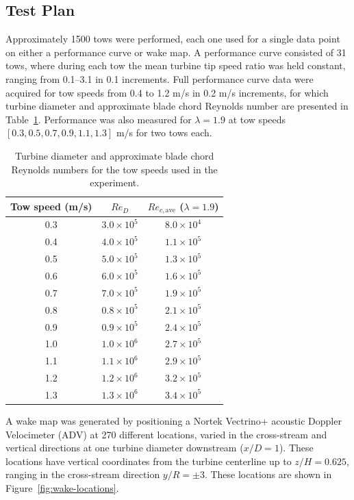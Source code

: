 \documentclass[energies,article,accept,moreauthors,pdftex,12pt,a4paper]{mdpi}
\begin{document}


\subsection{Test Plan} 

Approximately 1500 tows were performed, each one used for a single data point on
either a performance curve or wake map. A performance curve consisted of 31
tows, where during each tow the mean turbine tip speed ratio was held constant,
ranging from 0.1--3.1 in 0.1 increments. Full performance curve data were
acquired for tow speeds from 0.4 to 1.2 m/s in 0.2 m/s increments, for which
turbine diameter and approximate blade chord Reynolds number are presented in
Table~\ref{tab:Re}. Performance was also measured for $\lambda=1.9$ at tow
speeds $[0.3, 0.5, 0.7, 0.9, 1.1, 1.3]$ m/s for two tows each.

\begin{table}
\centering
\begin{tabular}{ccc}
Tow speed (m/s) & $Re_D$ & $Re_{c,\mathrm{ave}}$ ($\lambda = 1.9$) \\ 
\hline
0.3 & $3.0 \times 10^5$ & $8.0 \times 10^4$ \\ 
0.4 & $4.0 \times 10^5$ & $1.1 \times 10^5$ \\ 
0.5 & $5.0 \times 10^5$ & $1.3 \times 10^5$ \\ 
0.6 & $6.0 \times 10^5$ & $1.6 \times 10^5$ \\ 
0.7 & $7.0 \times 10^5$ & $1.9 \times 10^5$ \\ 
0.8 & $0.8 \times 10^5$ & $2.1 \times 10^5$ \\ 
0.9 & $0.9 \times 10^5$ & $2.4 \times 10^5$ \\ 
1.0 & $1.0 \times 10^6$ & $2.7 \times 10^5$ \\ 
1.1 & $1.1 \times 10^6$ & $2.9 \times 10^5$ \\ 
1.2 & $1.2 \times 10^6$ & $3.2 \times 10^5$ \\ 
1.3 & $1.3 \times 10^6$ & $3.4 \times 10^5$ \\ 
\end{tabular} 
\caption{Turbine diameter and approximate blade chord Reynolds numbers for the
tow speeds used in the experiment.}
\label{tab:Re}
\end{table}

A wake map was generated by positioning a Nortek Vectrino+ acoustic Doppler
Velocimeter (ADV) at 270 different locations, varied in the cross-stream and
vertical directions at one turbine diameter downstream ($x/D=1$). These
locations have vertical coordinates from the turbine centerline up to
$z/H=0.625$, ranging in the cross-stream direction $y/R = \pm 3$. These
locations are shown in Figure~\ref{fig:wake-locations}.
\end{document}
